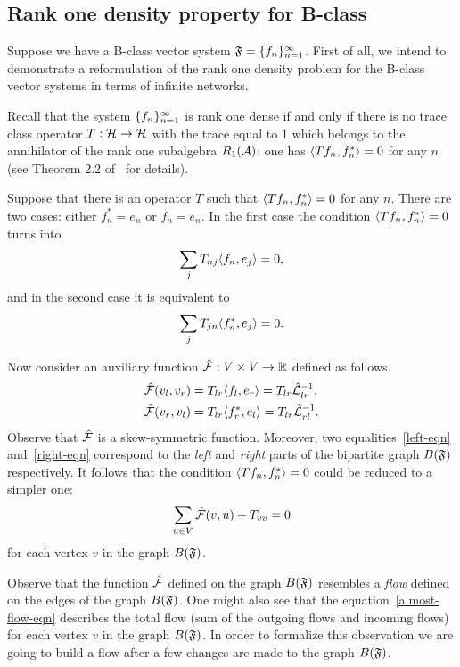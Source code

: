 \documentclass[12pt]{amsart}
\begin{document}
    \subsection{Rank one density property for B-class}
    Suppose we have a B-class vector system $\fsys=\seq{f}$.
    First of all, we intend to demonstrate a reformulation of the rank one density problem for
      the B-class vector systems in terms of infinite networks.

    Recall that the system $\seq{f}$ is rank one dense
      if and only if there is no trace class operator $T: \cal{H} \to \cal{H}$ with the trace equal to $1$
      which belongs to the annihilator of the rank one subalgebra $R_1(\cal{A})$: one has $\inner{Tf_n}{f_n^*} = 0$ for any $n$
      (see Theorem 2.2 of~\cite{katavolos} for details).

    Suppose that there is an operator $T$ such that $\inner{Tf_n}{f_n^*} = 0$ for any $n$.
    There are two cases: either $f^*_n = e_n$ or $f_n = e_n$.
    In the first case the condition $\inner{Tf_n}{f_n^*} = 0$ turns into
    \begin{equation}
        \label{left-eqn}
        \sum_j T_{nj} \inner{f_n}{e_j} = 0,
    \end{equation}
    and in the second case it is equivalent to
    \begin{equation}
        \label{right-eqn}
        \sum_j T_{jn} \inner{f^*_n}{e_j} = 0.
    \end{equation}

    Now consider an auxiliary function $\flowsgn: V \times V \to \mathbb{R}$ defined as follows
    \begin{align*}
        &\flowsgn(v_l, v_r) = T_{lr} \inner{f_l}{e_r} = T_{lr} \wt_{lr}^{-1},\\
        &\flowsgn(v_r, v_l) = T_{lr} \inner{f^*_r}{e_l} = T_{lr} \wt_{rl}^{-1}.
    \end{align*}
    Observe that $\flowsgn$ is a skew-symmetric function.
    Moreover, two equalities~\eqref{left-eqn} and~\eqref{right-eqn} correspond to the \emph{left} and \emph{right}
      parts of the bipartite graph $B(\fsys)$ respectively.
    It follows that the condition $\inner{Tf_n}{f_n^*} = 0$ could be reduced to a simpler one:
    \begin{equation}
      \label{almost-flow-eqn}
      \sum_{u \in V} \flowsgn(v, u) + T_{vv} = 0
    \end{equation}
      for each vertex $v$ in the graph $B(\fsys)$.
    \begin{remark}
      Observe that the function $\flowsgn$ defined on the graph $B(\fsys)$ resembles
        a \emph{flow} defined on the edges of the graph $B(\fsys)$.
      One might also see that the equation~\eqref{almost-flow-eqn} describes the total flow (sum of the outgoing flows and incoming flows) 
        for each vertex $v$ in the graph $B(\fsys)$.
      In order to formalize this observation we are going to build a flow
        after a few changes are made to the graph $B(\fsys)$.
    \end{remark}
\end{document}
